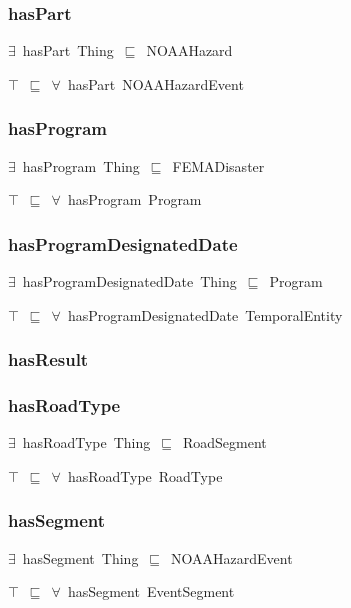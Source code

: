\documentclass{article}
\begin{document}
\subsubsection*{hasPart}

\ensuremath{\exists}~hasPart~Thing~\ensuremath{\sqsubseteq}~NOAAHazard

\ensuremath{\top}~\ensuremath{\sqsubseteq}~\ensuremath{\forall}~hasPart~NOAAHazardEvent

\subsubsection*{hasProgram}

\ensuremath{\exists}~hasProgram~Thing~\ensuremath{\sqsubseteq}~FEMADisaster

\ensuremath{\top}~\ensuremath{\sqsubseteq}~\ensuremath{\forall}~hasProgram~Program

\subsubsection*{hasProgramDesignatedDate}

\ensuremath{\exists}~hasProgramDesignatedDate~Thing~\ensuremath{\sqsubseteq}~Program

\ensuremath{\top}~\ensuremath{\sqsubseteq}~\ensuremath{\forall}~hasProgramDesignatedDate~TemporalEntity

\subsubsection*{hasResult}

\subsubsection*{hasRoadType}

\ensuremath{\exists}~hasRoadType~Thing~\ensuremath{\sqsubseteq}~RoadSegment

\ensuremath{\top}~\ensuremath{\sqsubseteq}~\ensuremath{\forall}~hasRoadType~RoadType

\subsubsection*{hasSegment}

\ensuremath{\exists}~hasSegment~Thing~\ensuremath{\sqsubseteq}~NOAAHazardEvent

\ensuremath{\top}~\ensuremath{\sqsubseteq}~\ensuremath{\forall}~hasSegment~EventSegment
\end{document}
